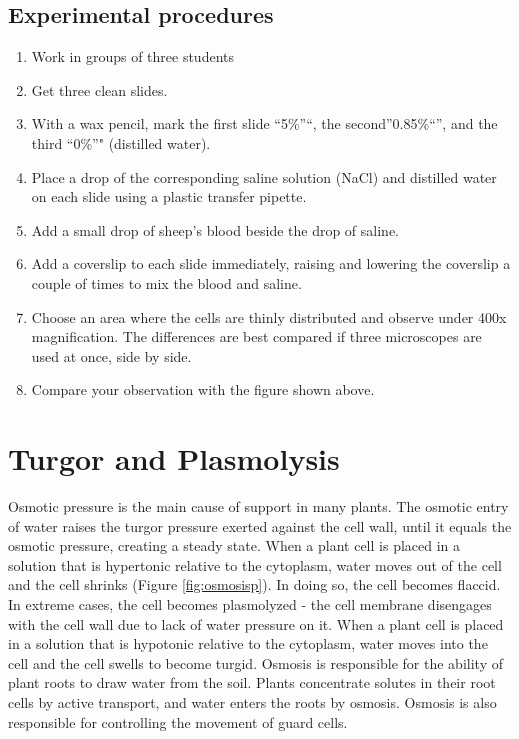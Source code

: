 \documentclass[]{book}
\providecommand{\tightlist}{%
  \setlength{\itemsep}{0pt}\setlength{\parskip}{0pt}}
\theoremstyle{definition}
\theoremstyle{definition}
\theoremstyle{definition}
\theoremstyle{remark}
\begin{document}
\subsection{Experimental procedures}\label{experimental-procedures-18}

\begin{enumerate}
\def\labelenumi{\arabic{enumi}.}
\tightlist
\item
  Work in groups of three students
\item
  Get three clean slides.
\item
  With a wax pencil, mark the first slide ``5\%''``, the
  second''0.85\%``'', and the third ``0\%''" (distilled water).
\item
  Place a drop of the corresponding saline solution (NaCl) and distilled
  water on each slide using a plastic transfer pipette.
\item
  Add a small drop of sheep's blood beside the drop of saline.
\item
  Add a coverslip to each slide immediately, raising and lowering the
  coverslip a couple of times to mix the blood and saline.
\item
  Choose an area where the cells are thinly distributed and observe
  under 400x magnification. The differences are best compared if three
  microscopes are used at once, side by side.
\item
  Compare your observation with the figure shown above.
\end{enumerate}

\section{Turgor and Plasmolysis}\label{turgor-and-plasmolysis}

Osmotic pressure is the main cause of support in many plants. The
osmotic entry of water raises the turgor pressure exerted against the
cell wall, until it equals the osmotic pressure, creating a steady
state. When a plant cell is placed in a solution that is hypertonic
relative to the cytoplasm, water moves out of the cell and the cell
shrinks (Figure \ref{fig:osmosisp}). In doing so, the cell becomes
flaccid. In extreme cases, the cell becomes plasmolyzed - the cell
membrane disengages with the cell wall due to lack of water pressure on
it. When a plant cell is placed in a solution that is hypotonic relative
to the cytoplasm, water moves into the cell and the cell swells to
become turgid. Osmosis is responsible for the ability of plant roots to
draw water from the soil. Plants concentrate solutes in their root cells
by active transport, and water enters the roots by osmosis. Osmosis is
also responsible for controlling the movement of guard cells.
\end{document}
